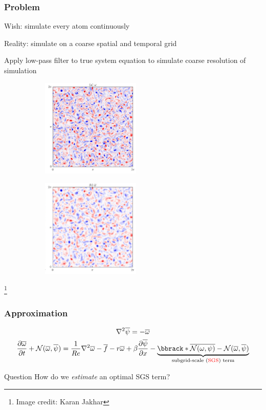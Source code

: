 \documentclass{beamer}
\newcommand{\ol}{\overline}
\newcommand\blfootnote[1]{%
  \begingroup
  \renewcommand\thefootnote{}\footnote{#1}%
  \addtocounter{footnote}{-1}%
  \endgroup
}
\begin{document}
\begin{frame}
  \frametitle{Problem}
  Wish: simulate every atom continuously
  \pause

  Reality: simulate on a coarse spatial and temporal grid
  \newline
  \pause

  Apply low-pass filter to true system equation to simulate coarse resolution
  of simulation

  \begin{figure}
    \centering
    \begin{subfigure}{0.45\textwidth}
      \centering
      \includegraphics[height=1.85in, keepaspectratio]{karan1.pdf}
    \end{subfigure}
    \begin{subfigure}{0.45\textwidth}
      \centering
      \includegraphics[height=1.85in, keepaspectratio]{karan2.pdf}
    \end{subfigure}
  \end{figure}
  \blfootnote{Image credit: Karan Jakhar}
\end{frame}

\begin{frame}
  \frametitle{Approximation}
  \begin{equation}
    \begin{gathered}
      \nabla^2 \ol \psi = - \ol \omega \\
      \frac{\partial \ol \omega}{\partial t} + \mathcal N(\ol \omega, \ol \psi)
      = \frac1{Re} \nabla^2 \ol \omega - \ol f - r \ol \omega
      + \beta \frac{\partial \ol \psi}{\partial x}
      - \underbrace{
        \bbrack*{\ol{\mathcal N(\omega, \psi)}
        - \mathcal N(\ol \omega, \ol \psi)}
      }_{\text{subgrid-scale (} \textcolor{red}{\text{SGS}} \text{) term}}
    \end{gathered}
  \end{equation}
  \pause

  \begin{block}{Question}
    How do we \textit{estimate} an optimal SGS term?
  \end{block}
\end{frame}
\end{document}
